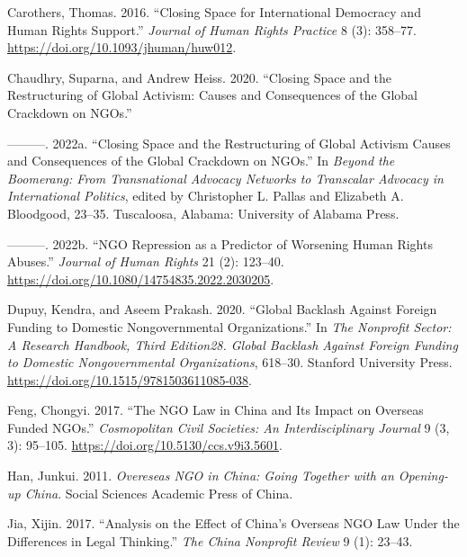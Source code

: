 \documentclass[
]{article}
\newlength{\cslhangindent}
\newlength{\cslentryspacingunit} %
\newenvironment{CSLReferences}[2] %
 {%
  \setlength{\parindent}{0pt}
  \ifodd #1
  \let\oldpar\par
  \def\par{\hangindent=\cslhangindent\oldpar}
  \fi
  \setlength{\parskip}{#2\cslentryspacingunit}
 }%
 {}
\begin{document}
\hypertarget{refs}{}
\begin{CSLReferences}{1}{0}
\leavevmode{}%
Carothers, Thomas. 2016. {``Closing {Space} for {International
Democracy} and {Human Rights Support}.''} \emph{Journal of Human Rights
Practice} 8 (3): 358--77. \url{https://doi.org/10.1093/jhuman/huw012}.

\leavevmode{}%
Chaudhry, Suparna, and Andrew Heiss. 2020. {``Closing {Space} and the
{Restructuring} of {Global Activism}: {Causes} and {Consequences} of the
{Global Crackdown} on {NGOs}.''}

\leavevmode{}%
---------. 2022a. {``Closing {Space} and the {Restructuring} of {Global
Activism Causes} and {Consequences} of the {Global Crackdown} on
{NGOs}.''} In \emph{Beyond the {Boomerang}: {From Transnational Advocacy
Networks} to {Transcalar Advocacy} in {International Politics}}, edited
by Christopher L. Pallas and Elizabeth A. Bloodgood, 23--35.
{Tuscaloosa, Alabama}: {University of Alabama Press}.

\leavevmode{}%
---------. 2022b. {``{NGO} Repression as a Predictor of Worsening Human
Rights Abuses.''} \emph{Journal of Human Rights} 21 (2): 123--40.
\url{https://doi.org/10.1080/14754835.2022.2030205}.

\leavevmode{}%
Dupuy, Kendra, and Aseem Prakash. 2020. {``Global {Backlash} Against
{Foreign Funding} to {Domestic Nongovernmental Organizations}.''} In
\emph{The {Nonprofit Sector}: {A Research Handbook}, {Third Edition28}.
{Global Backlash} Against {Foreign Funding} to {Domestic Nongovernmental
Organizations}}, 618--30. {Stanford University Press}.
\url{https://doi.org/10.1515/9781503611085-038}.

\leavevmode{}%
Feng, Chongyi. 2017. {``The {NGO} Law in {China} and Its Impact on
{Overseas} Funded {NGOs}.''} \emph{Cosmopolitan Civil Societies: An
Interdisciplinary Journal} 9 (3, 3): 95--105.
\url{https://doi.org/10.5130/ccs.v9i3.5601}.

\leavevmode{}%
Han, Junkui. 2011. \emph{Overeseas NGO in China: Going Together with an
Opening-up China}. {Social Sciences Academic Press of China}.

\leavevmode{}%
Jia, Xijin. 2017. {``Analysis on the Effect of {China}'s Overseas {NGO}
Law Under the Differences in Legal Thinking.''} \emph{The China
Nonprofit Review} 9 (1): 23--43.


\end{CSLReferences}
\end{document}
